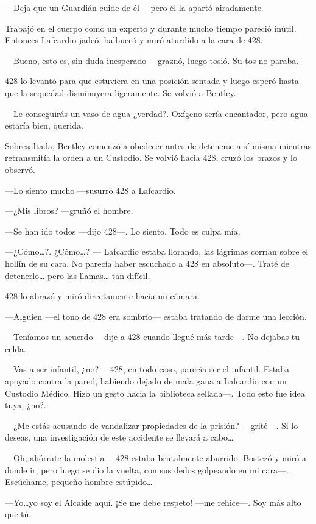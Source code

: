 ---Deja que un Guardián cuide de él ---pero él la apartó airadamente.

Trabajó en el cuerpo como un experto y durante mucho tiempo pareció
inútil. Entonces Lafcardio jadeó, balbuceó y miró aturdido a la cara de
428.

---Bueno, esto es, sin duda inesperado ---graznó, luego tosió. Su tos no
paraba.

428 lo levantó para que estuviera en una posición sentada y luego esperó
hasta que la sequedad disminuyera ligeramente. Se volvió a Bentley.

---Le conseguirás un vaso de agua ¿verdad?. Oxígeno sería encantador,
pero agua estaría bien, querida.

Sobresaltada, Bentley comenzó a obedecer antes de detenerse a sí misma
mientras retransmitía la orden a un Custodio. Se volvió hacia 428, cruzó
los brazos y lo observó.

---Lo siento mucho ---susurró 428 a Lafcardio.

---¿Mis libros? ---gruñó el hombre.

---Se han ido todos ---dijo 428---. Lo siento. Todo es culpa mía.

---¿Cómo\ldots{}?. ¿Cómo\ldots{}? --- Lafcardio estaba llorando, las
lágrimas corrían sobre el hollín de su cara. No parecía haber escuchado
a 428 en absoluto---. Traté de detenerlo\ldots{} pero las llamas\ldots{}
tan difícil.

428 lo abrazó y miró directamente hacia mi cámara.

---Alguien ---el tono de 428 era sombrío--- estaba tratando de darme una
lección.

---Teníamos un acuerdo ---dije a 428 cuando llegué más tarde---. No
dejabas tu celda.

---Vas a ser infantil, ¿no? ---428, en todo caso, parecía ser el
infantil. Estaba apoyado contra la pared, habiendo dejado de mala gana a
Lafcardio con un Custodio Médico. Hizo un gesto hacia la biblioteca
sellada---. Todo esto fue idea tuya, ¿no?.

---¿Me estás acusando de vandalizar propiedades de la prisión?
---grité---. Si lo deseas, una investigación de este accidente se
llevará a cabo\ldots{}

---Oh, ahórrate la molestia ---428 estaba brutalmente aburrido. Bostezó
y miró a donde ir, pero luego se dio la vuelta, con sus dedos golpeando
en mi cara---. Escúchame, pequeño hombre estúpido\ldots{}

---Yo\ldots{}yo soy el Alcaide aquí. ¡Se me debe respeto! ---me
rehice---. Soy más alto que tú.

